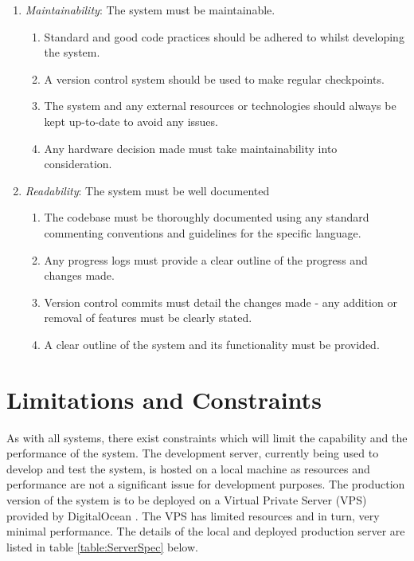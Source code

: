 \begin{enumerate}[label=\textbf{NF\arabic*}]
\begin{enumerate}
		\end{enumerate}
	\item \textit{Maintainability}: The system must be maintainable.
		\begin{enumerate}
			\item Standard and good code practices should be adhered to whilst developing the system.
			\item A version control system should be used to make regular checkpoints.
			\item The system and any external resources or technologies should always be kept up-to-date to avoid any issues.
			\item Any hardware decision made must take maintainability into consideration.
		\end{enumerate}
	\item \textit{Readability}: The system must be well documented
		\begin{enumerate}
			\item The codebase must be thoroughly documented using any standard commenting conventions and guidelines for the specific language.
			\item Any progress logs must provide a clear outline of the progress and changes made.
			\item Version control commits must detail the changes made - any addition or removal of features must be clearly stated.
			\item A clear outline of the system and its functionality must be provided.
		\end{enumerate}
\end{enumerate}

\section{Limitations and Constraints}
As with all systems, there exist constraints which will limit the capability and the performance of the system. The development server, currently being used to develop and test the system, is hosted on a local machine as resources and performance are not a significant issue for development purposes. The production version of the system is to be deployed on a Virtual Private Server (VPS) provided by DigitalOcean \cite{DigitalOcean:Home}. The VPS has limited resources and in turn, very minimal performance. The details of the local and deployed production server are listed in table \ref{table:ServerSpec} below.

